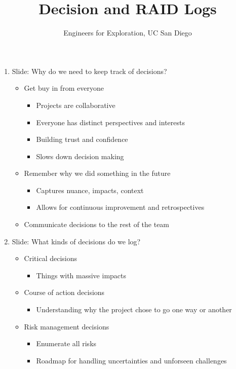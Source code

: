 \documentclass{article}
\title{Decision and RAID Logs}
\author{Engineers for Exploration, UC San Diego}
\begin{document}
\maketitle
\begin{enumerate}
    \item Slide: Why do we need to keep track of decisions?
    \begin{itemize}
        \item Get buy in from everyone
        \begin{itemize}
            \item Projects are collaborative
            \item Everyone has distinct perspectives and interests
            \item Building trust and confidence
            \item Slows down decision making
        \end{itemize}
        \item Remember why we did something in the future
        \begin{itemize}
            \item Captures nuance, impacts, context
            \item Allows for continuous improvement and retrospectives
        \end{itemize}
        \item Communicate decisions to the rest of the team
    \end{itemize}
    \item Slide: What kinds of decisions do we log?
    \begin{itemize}
        \item Critical decisions
        \begin{itemize}
            \item Things with massive impacts
        \end{itemize}
        \item Course of action decisions
        \begin{itemize}
            \item Understanding why the project chose to go one way or another
        \end{itemize}
        \item Risk management decisions
        \begin{itemize}
            \item Enumerate all risks
            \item Roadmap for handling uncertainties and unforseen challenges

\end{itemize}
\end{itemize}
\end{enumerate}
\end{document}
